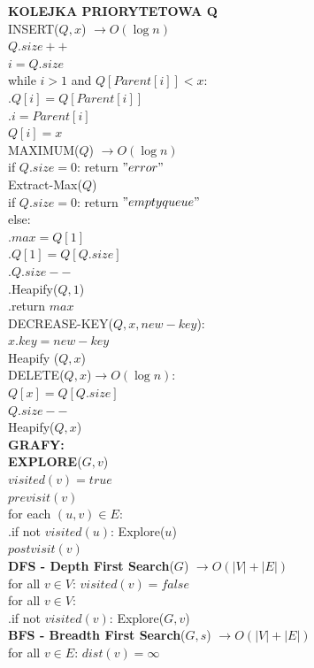 \documentclass[8pt,a3paper]{article}
\begin{document}
\begin{multicols*}{3}
	 \textbf{KOLEJKA PRIORYTETOWA Q}\\
	 INSERT($Q,x$) $\to O(\log n)$\\
	 $Q.size++$ \\
	 $i = Q.size$ \\
	 while $i>1$ and $Q[Parent[i]] <x$: \\
	 .\quad $Q[i] = Q[Parent[i]]$ \\
	 .\quad $i = Parent[i] $ \\
	 $Q[i]=x$ \\
	 MAXIMUM($Q$) $\to O(\log n)$ \\
	 if $Q.size = 0$: return $"error"$ \\
	 Extract-Max($Q$) \\
	 if $Q.size = 0$: return $"empty queue"$ \\
	 else: \\
	 .\quad $max = Q[1]$ \\
	 .\quad $Q[1] = Q[Q.size]$ \\
	 .\quad $Q.size --$ \\
	 .\quad Heapify($Q,1$) \\
	 .\quad return $max$ \\
	 DECREASE-KEY($Q,x,new-key$): \\
	 $x.key = new-key$ \\
	 Heapify ($Q,x$) \\
	 DELETE($Q,x$)$\to O(\log n)$: \\
	 $Q[x] = Q[Q.size]$ \\
	 $Q.size--$ \\
	 Heapify($Q,x$) \\
	 \textbf{GRAFY:}\\
	 \textbf{EXPLORE}($G,v$) \\
	 $visited(v) = true$ \\
	 $previsit(v)$ \\
	 for each $(u,v) \in E$:\\
	 .\quad if not $visited(u)$: Explore($u$) \\
	 $postvisit(v)$ \\
	 \textbf{DFS - Depth First Search}($G$) $\to O(|V|+|E|)$ \\
	 for all $v \in V$: $visited(v)=false$ \\
	 for all $v \in V$: \\
	 .\quad if not $visited(v)$: Explore($G,v$) \\
	 \textbf{BFS - Breadth First Search}($G,s$) $\to O(|V|+|E|)$ \\
	 for all $v \in E$: $dist(v) = \infty $ \\

\end{multicols*}
\end{document}
